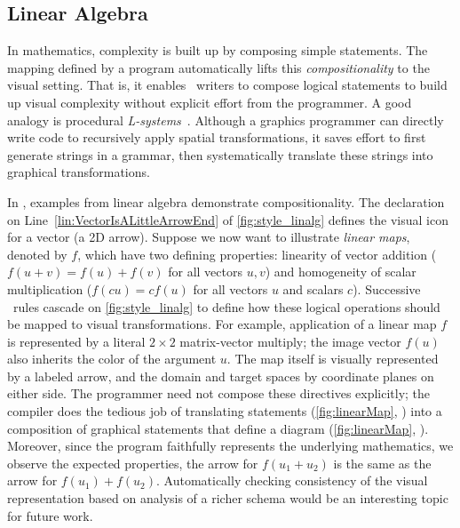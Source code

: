 \subsection{Linear Algebra}
\label{sec:LinearAlgebra}


In mathematics, complexity is built up by composing simple statements. The mapping defined by a \Style{} program automatically lifts this \emph{compositionality} to the visual setting. That is, it enables \Substance\ writers to compose logical statements to build up visual complexity without explicit effort from the \Style{} programmer.  A good analogy is procedural \emph{L-systems}~\cite{Prusinkiewicz:2012:ABP}. Although a graphics programmer can directly write code to recursively apply spatial transformations, it saves effort to first generate strings in a grammar, then systematically translate these strings into graphical transformations.

In \Penrose{}, examples from linear algebra demonstrate compositionality.  The \Style{} declaration on Line~\ref{lin:VectorIsALittleArrowEnd} of \cref{fig:style_linalg} defines the visual icon for a vector (a 2D arrow).  Suppose we now want to illustrate \emph{linear maps}, denoted by \(f\), which have two defining properties: linearity of vector addition (\(f(u+v) = f(u)+f(v)\) for all vectors \(u,v\)) and homogeneity of scalar multiplication (\(f(cu) = cf(u)\) for all vectors \(u\) and scalars \(c\)).  Successive \Style\ rules cascade on \cref{fig:style_linalg} to define how these logical operations  should be mapped to visual transformations.  For example, application of a linear map \(f\) is represented by a literal $2 \times 2$ matrix-vector multiply; the image vector \(f(u)\) also inherits the color of the argument \(u\). The map itself is visually represented by a labeled arrow, and the domain and target spaces by coordinate planes on either side. The \Style{} programmer need not compose these directives explicitly; the compiler does the tedious job of translating \Substance{} statements (\cref{fig:linearMap}, ) into a composition of graphical statements that define a diagram (\cref{fig:linearMap}, ).  Moreover, since the \Style{} program faithfully represents the underlying mathematics, we observe the expected properties, \eg the arrow for \(f(u_1+u_2)\) is the same as the arrow for \(f(u_1)+f(u_2)\).  Automatically checking consistency of the visual representation based on analysis of a richer \Domain{} schema would be an interesting topic for future work.

